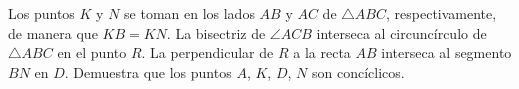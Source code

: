 Los puntos $K$ y $N$ se toman en los lados $AB$ y $AC$ de $\triangle ABC$, respectivamente, de manera que $KB = KN$. La bisectriz de $\angle ACB$ interseca al circuncírculo de $\triangle ABC$ en el punto $R$. La perpendicular de $R$ a la recta $AB$ interseca al segmento $BN$ en $D$. Demuestra que los puntos $A$, $K$, $D$, $N$ son concíclicos.